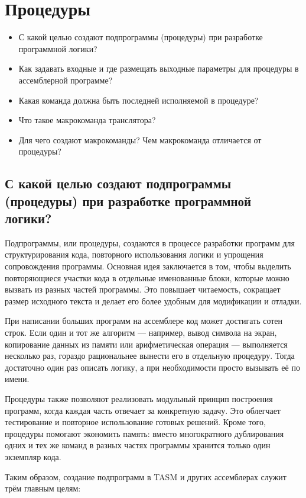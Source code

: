 \chapter{Процедуры}
\begin{itemize}
\item С какой целью создают подпрограммы (процедуры) при разработке программной логики?
\item Как задавать входные и где размещать выходные параметры для процедуры в ассемблерной программе?
\item Какая команда должна быть последней исполняемой в процедуре?
\item Что такое макрокоманда транслятора?
\item Для чего создают макрокоманды? Чем макрокоманда отличается от процедуры?
\end{itemize}

\section{С какой целью создают подпрограммы (процедуры) при разработке программной логики?}

Подпрограммы, или процедуры, создаются в процессе разработки программ для структурирования кода, повторного использования логики и упрощения сопровождения программы. Основная идея заключается в том, чтобы выделить повторяющиеся участки кода в отдельные именованные блоки, которые можно вызвать из разных частей программы. Это повышает читаемость, сокращает размер исходного текста и делает его более удобным для модификации и отладки.

При написании больших программ на ассемблере код может достигать сотен строк. Если один и тот же алгоритм — например, вывод символа на экран, копирование данных из памяти или арифметическая операция — выполняется несколько раз, гораздо рациональнее вынести его в отдельную процедуру. Тогда достаточно один раз описать логику, а при необходимости просто вызывать её по имени.

Процедуры также позволяют реализовать модульный принцип построения программ, когда каждая часть отвечает за конкретную задачу. Это облегчает тестирование и повторное использование готовых решений. Кроме того, процедуры помогают экономить память: вместо многократного дублирования одних и тех же команд в разных частях программы хранится только один экземпляр кода.

Таким образом, создание подпрограмм в TASM и других ассемблерах служит трём главным целям:

